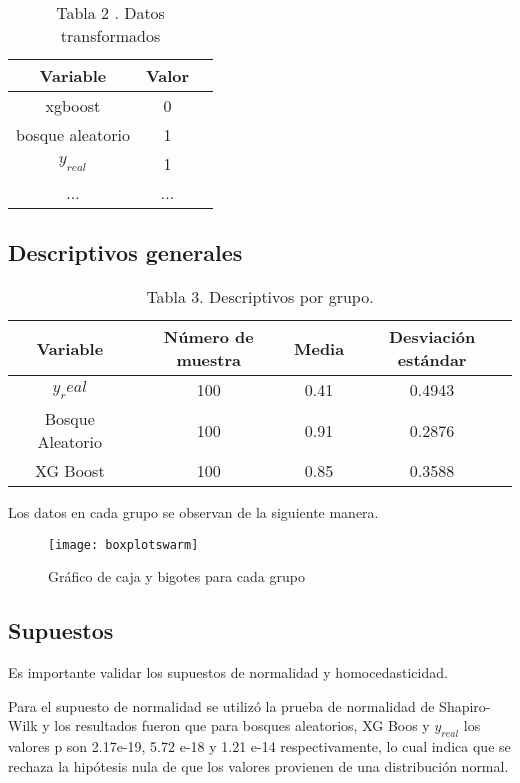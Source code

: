 \documentclass{article}
\begin{document}
\begin{table}[hbt!]
\begin{center}
\begin{tabular}{| c | c |c|}
\hline
Variable & Valor \\ \hline
xgboost & 0  \\
bosque aleatorio & 1  \\
$y_{real}$ & 1  \\ 
... &  ...\\
\hline
\end{tabular}
\caption{Tabla 2 . Datos transformados}
\label{tab:fruta}
\end{center}
\end{table}

\subsection{Descriptivos generales}
\begin{table}[hbt!]
\begin{center}
\begin{tabular}{| c | c |c|c|}
\hline
Variable & Número de muestra & Media & Desviación estándar \\ \hline
$y_real$ & 100 & 0.41 & 0.4943\\
Bosque Aleatorio & 100 & 0.91 & 0.2876\\
XG Boost & 100 & 0.85 & 0.3588 \\ 
\hline
\end{tabular}
\caption{Tabla 3. Descriptivos por grupo.}
\label{tab:fruta}
\end{center}
\end{table}


Los datos en cada grupo se observan de la siguiente manera.

\begin{figure}[!htp]
    \centering
    \texttt{[image: boxplotswarm]}
    \caption{Gráfico de caja y bigotes para cada grupo}
    \label{fig:galaxy}
\end{figure}

\subsection{Supuestos}

Es importante validar los supuestos de normalidad y homocedasticidad.

Para el supuesto de normalidad se utilizó la prueba de normalidad de Shapiro- Wilk y los resultados fueron que para bosques aleatorios, XG Boos y $y_{real}$ los valores p son 2.17e-19, 5.72 e-18 y 1.21 e-14 respectivamente, lo cual indica que se rechaza la hipótesis nula de que los valores provienen de una distribución normal.
\end{document}
